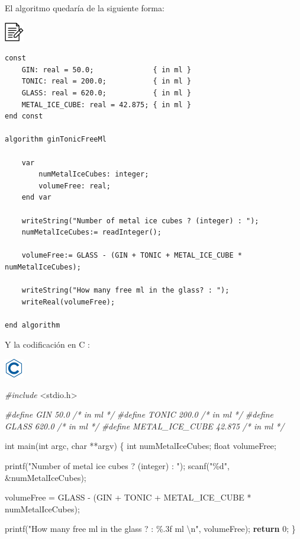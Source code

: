\documentclass[
]{book}
\newenvironment{Shaded}{\begin{snugshade}}{\end{snugshade}}
\newcommand{\CommentTok}[1]{\textcolor[rgb]{0.56,0.35,0.01}{\textit{#1}}}
\newcommand{\ControlFlowTok}[1]{\textcolor[rgb]{0.13,0.29,0.53}{\textbf{#1}}}
\newcommand{\DataTypeTok}[1]{\textcolor[rgb]{0.13,0.29,0.53}{#1}}
\newcommand{\DecValTok}[1]{\textcolor[rgb]{0.00,0.00,0.81}{#1}}
\newcommand{\ImportTok}[1]{#1}
\newcommand{\NormalTok}[1]{#1}
\newcommand{\PreprocessorTok}[1]{\textcolor[rgb]{0.56,0.35,0.01}{\textit{#1}}}
\newcommand{\SpecialCharTok}[1]{\textcolor[rgb]{0.00,0.00,0.00}{#1}}
\newcommand{\StringTok}[1]{\textcolor[rgb]{0.31,0.60,0.02}{#1}}
\begin{document}
El algoritmo quedaría de la siguiente forma:

\includegraphics{./img/alg.png}

\begin{verbatim}
const
    GIN: real = 50.0;              { in ml }
    TONIC: real = 200.0;           { in ml }
    GLASS: real = 620.0;           { in ml }
    METAL_ICE_CUBE: real = 42.875; { in ml }
end const

algorithm ginTonicFreeMl

    var
        numMetalIceCubes: integer;
        volumeFree: real;
    end var

    writeString("Number of metal ice cubes ? (integer) : ");
    numMetalIceCubes:= readInteger();

    volumeFree:= GLASS - (GIN + TONIC + METAL_ICE_CUBE * numMetalIceCubes);

    writeString("How many free ml in the glass? : ");
    writeReal(volumeFree);

end algorithm
\end{verbatim}

Y la codificación en C :

\includegraphics{./img/c.png}

\begin{Shaded}
\begin{Highlighting}[]
\PreprocessorTok{\#include }\ImportTok{\textless{}stdio.h\textgreater{}}

\PreprocessorTok{\#define GIN 50.0              }\CommentTok{/* in ml */}
\PreprocessorTok{\#define TONIC 200.0           }\CommentTok{/* in ml */}
\PreprocessorTok{\#define GLASS 620.0           }\CommentTok{/* in ml */}
\PreprocessorTok{\#define METAL\_ICE\_CUBE 42.875 }\CommentTok{/* in ml */}

\DataTypeTok{int}\NormalTok{ main(}\DataTypeTok{int}\NormalTok{ argc, }\DataTypeTok{char}\NormalTok{ **argv) \{}
    \DataTypeTok{int}\NormalTok{ numMetalIceCubes;}
    \DataTypeTok{float}\NormalTok{ volumeFree;}

\NormalTok{    printf(}\StringTok{"Number of metal ice cubes ? (integer) : "}\NormalTok{);}
\NormalTok{    scanf(}\StringTok{"\%d"}\NormalTok{, \&numMetalIceCubes);}

\NormalTok{    volumeFree = GLASS {-} (GIN + TONIC + METAL\_ICE\_CUBE * numMetalIceCubes);}

\NormalTok{    printf(}\StringTok{"How many free ml in the glass ? : \%.3f ml }\SpecialCharTok{\textbackslash{}n}\StringTok{"}\NormalTok{, volumeFree);}
    \ControlFlowTok{return} \DecValTok{0}\NormalTok{;}
\NormalTok{\}}
\end{Highlighting}
\end{Shaded}
\end{document}
